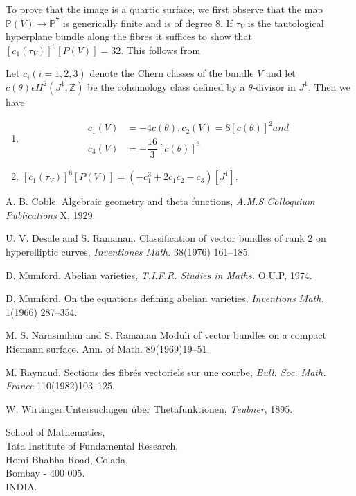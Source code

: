 To prove that the image is a quartic surface, we first observe that
the map $\mathbb{P}(V)\to \mathbb{P}^{7}$ is generically finite and is
of degree $8$. If $\tau_{V}$ is the tautological hyperplane bundle
along the fibres it suffices to show that
$[c_1(\tau_V)]^{6}[P(V)]=32$. This follows from 

\begin{lemma}\label{lemma5.5}
Let $c_i(i=1,2,3)$ denote the Chern classes of the bundle $V$ and let
$c(\theta)\epsilon H^{2}\left(J^{1}, \mathbb{Z}\right)$ be the
cohomology class defined by a $\theta$-divisor in $J^{1}$. Then we
have \pageoriginale
\begin{enumerate}
\renewcommand{\labelenumi}{(\theenumi)}
\item 
$$
\begin{aligned}
c_1(V)&=-4c(\theta),c_2(V)=8[c(\theta)]^{2}and\\
c_3(V)&{}=-\dfrac{16}{3}[c(\theta)]^{3}
\end{aligned}
$$
\item $[c_1(\tau_V)]^{6}[P(V)]=\left(-c^{3}_1+2c_1 c_2-c_3\right)\left[J^{1}\right]$. 
\end{enumerate}
\end{lemma}


\begin{thebibliography}{99}
{A. B. Coble.} Algebraic geometry and theta functions,
\textit{A.M.S Colloquium Publications} X, 1929.

{U. V. Desale and S. Ramanan.} Classification of vector bundles
of rank $2$ on hyperelliptic curves, \textit{Inventiones Math.}
38(1976) 161--185.

{D. Mumford.} Abelian varieties, \textit{T.I.F.R. Studies in
  Maths.} O.U.P, 1974.

{D. Mumford.} On the equations defining abelian varieties,
\textit{Inventions Math.} 1(1966) 287--354.

{M. S. Narasimhan and S. Ramanan} Moduli of vector bundles on a
compact Riemann surface. Ann. of Math. 89(1969)19--51.

{M. Raynaud.} Sections des fibr\'{e}s vectoriels sur une
courbe, \textit{Bull. Soc. Math. France} 110(1982)103--125.

{W. Wirtinger.}\pageoriginale Untersuchugen \"{u}ber Thetafunktionen,
\textit{Teubner}, 1895.
\end{thebibliography}

\vskip 1cm

\noindent
School of Mathematics,\\
Tata Institute of Fundamental Research,\\
Homi Bhabha Road, Colada,\\
Bombay - 400 005.\\
INDIA.
